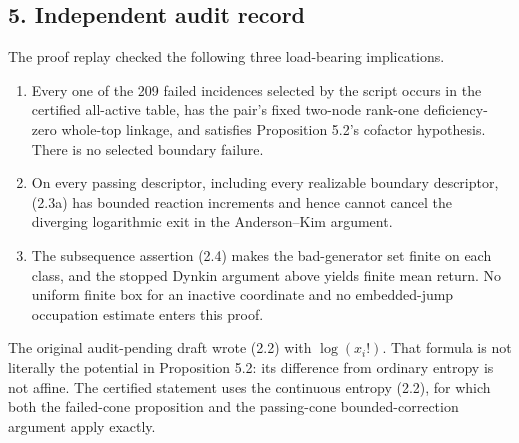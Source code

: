 \subsection{5. Independent audit record}

The proof replay checked the following three load-bearing implications.

\begin{enumerate}
\def\labelenumi{\arabic{enumi}.}
\tightlist
\item
  Every one of the 209 failed incidences selected by the script occurs
  in the certified all-active table, has the pair's fixed two-node
  rank-one deficiency-zero whole-top linkage, and satisfies Proposition
  5.2's cofactor hypothesis. There is no selected boundary failure.
\item
  On every passing descriptor, including every realizable boundary
  descriptor, (2.3a) has bounded reaction increments and hence cannot
  cancel the diverging logarithmic exit in the Anderson--Kim argument.
\item
  The subsequence assertion (2.4) makes the bad-generator set finite on
  each class, and the stopped Dynkin argument above yields finite mean
  return. No uniform finite box for an inactive coordinate and no
  embedded-jump occupation estimate enters this proof.
\end{enumerate}

The original audit-pending draft wrote (2.2) with \(\log(x_i!)\). That
formula is not literally the potential in Proposition 5.2: its
difference from ordinary entropy is not affine. The certified statement
uses the continuous entropy (2.2), for which both the failed-cone
proposition and the passing-cone bounded-correction argument apply
exactly.
